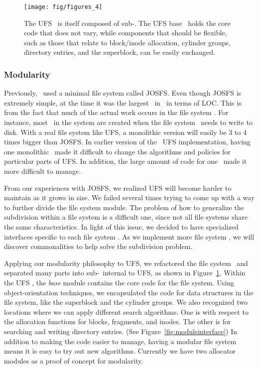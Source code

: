 \begin{figure}[htb]
  \centering
  \texttt{[image: fig/figures\_4]}
  \caption{\label{fig:ufsmodules} The UFS \module\ is itself composed of
  sub-\modules. The UFS base \module\ holds the core code that does not
  vary, while components that should be flexible, such as those that relate
  to block/inode allocation, cylinder groups, directory entries, and the
  superblock, can be easily exchanged.}
\end{figure}

\subsubsection {Modularity}
Previously, \Kudos\ used a minimal file system called JOSFS. Even though JOSFS
is extremely simple, at the time it was the largest \module\ in \Kudos\ in
terms of LOC. This is from the fact that much of the actual work occurs in the
file system \modules. For instance, most \chdescs\ in the system are created
when the file system \modules\ needs to write to disk. With a real file system
like UFS, a monolithic version will easily be 3 to 4 times bigger than JOSFS.
In earlier version of the \Kudos\ UFS implementation, having one monolithic
\module\ made it difficult to change the algorithms and policies for
particular parts of UFS. In addition, the large amount of code for one
\module\ made it more difficult to manage.

From our experiences with JOSFS, we realized UFS will become harder to maintain
as it grows in size. We failed several times trying to come up with a way to
further divide the file system module. The problem of how to generalize the
subdivision within a file system is a difficult one, since not all file systems
share the same characteristics. In light of this issue, we decided to have
specialized interfaces specific to each file system \module. As we implement
more file system \modules, we will discover commonalities to help solve the
subdivision problem.

Applying our modularity philosophy to UFS, we refactored the file system
\module\ and separated many parts into sub-\modules\ internal to UFS,
as shown in Figure~\ref{fig:ufsmodules}.
Within the UFS \module, the \emph{base} module contains the core code for the
file system. Using object-orientation techniques, we encapsulated the code
for data structures in the file system, like the superblock and the cylinder
groups. We also recognized two locations where we can apply different
search algorithms. One is with respect to the allocation functions for blocks,
fragments, and inodes. The other is for searching and writing directory
entries. (See Figure~\ref{fig:moduleinterface}) In addition to making the code
easier to manage, having a modular file system means it is easy to try out new
algorithms. Currently we have two allocator modules as a proof of concept for
modularity.

